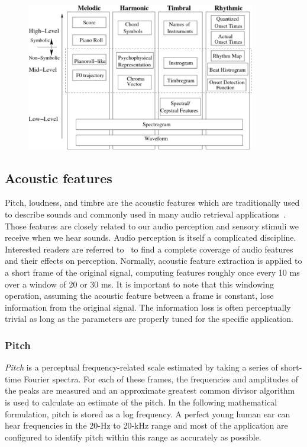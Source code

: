 \begin{figure}[htb]
	\centering
	\includegraphics[width=10cm]{Figures/low-to-high-features.png}
	\caption{}
	\label{low-to-high}
\end{figure}

\subsection{Acoustic features}
Pitch, loudness, and timbre are the acoustic features which are traditionally used to describe sounds and commonly used in many audio retrieval applications~\cite{erling1996, tzanetakis2002, kumar2013}. Those features are closely related to our audio perception and sensory stimuli we receive when we hear sounds. Audio perception is itself a complicated discipline. Interested readers are referred to~\cite{moore2003, bregman1990} to find a complete coverage of audio features and their effects on perception. Normally, acoustic feature extraction is applied to a short frame of the original signal, computing features roughly once every 10 ms over a window of 20 or 30 ms. It is important to note that this windowing operation, assuming the acoustic feature between a frame is constant, lose information from the original signal. The information loss is often perceptually trivial as long as the parameters are properly tuned for the specific application.

\subsubsection{Pitch}
\textit{Pitch} is a perceptual frequency-related scale estimated by taking a series of short-time Fourier spectra. For each of these frames, the frequencies and amplitudes of the peaks are measured and an approximate greatest common divisor algorithm is used to calculate an estimate of the pitch. In the following mathematical formulation, pitch is stored as a log frequency. A perfect young human ear can hear frequencies in the 20-Hz to 20-kHz range and most of the application are configured to identify pitch within this range as accurately as possible.

